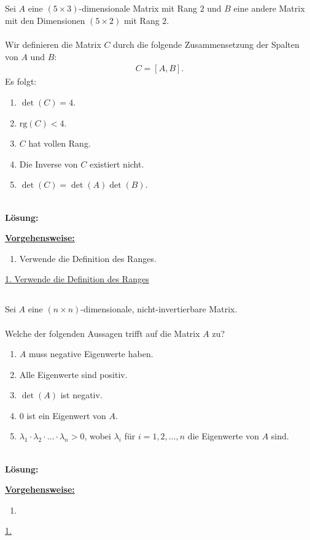 \subsection*{}
Sei $ A $ eine $ (5 \times 3) $-dimensionale Matrix mit Rang $ 2 $ und $ B $ eine andere Matrix mit den Dimensionen $ (5 \times 2) $ mit Rang $ 2 $.\\
\\
Wir definieren die Matrix $ C $ durch die folgende Zusammensetzung der Spalten von $ A $ und $ B $:
\begin{align*}
	C = [A, B].
\end{align*}
Es folgt:
\renewcommand{\labelenumi}{(\alph{enumi})}
\begin{enumerate}
	\item 
	$ \det(C) = 4$.
	\item
	$ \mathrm{rg}(C) < 4 $.
	\item
	$ C$ hat vollen Rang.
	\item
	Die Inverse von $C$ existiert nicht.
	\item
	$\det(C) = \det(A) \det(B)$.
\end{enumerate}
\ \\
\textbf{Lösung:}
\begin{mdframed}
	\underline{\textbf{Vorgehensweise:}}
	\renewcommand{\labelenumi}{\theenumi.}
	\begin{enumerate}
		\item Verwende die Definition des Ranges.
	\end{enumerate}
\end{mdframed}

\underline{1. Verwende die Definition des Ranges}\\


\newpage
\subsection*{}
Sei $A$ eine $(n \times n)$-dimensionale, nicht-invertierbare Matrix.\\
\\
Welche der folgenden Aussagen trifft auf die Matrix $A$ zu?
\renewcommand{\labelenumi}{(\alph{enumi})}
\begin{enumerate}
	\item 
	$A$ muss negative Eigenwerte haben.
	\item
	Alle Eigenwerte sind positiv.
	\item
	$\det(A)$ ist negativ.
	\item
	$0$ ist ein Eigenwert von $A$.
	\item 
	$\lambda_1 \cdot \lambda_2 \cdot \dots \cdot \lambda_n > 0 $, wobei $\lambda_i$ für $i = 1,2,\dots,n$ die Eigenwerte von $A$ sind.
\end{enumerate}
\ \\
\textbf{Lösung:}
\begin{mdframed}
	\underline{\textbf{Vorgehensweise:}}
	\renewcommand{\labelenumi}{\theenumi.}
	\begin{enumerate}
		\item 
	\end{enumerate}
\end{mdframed}

\underline{1. }\\
